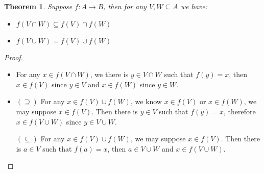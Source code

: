\documentclass[14pt]{extarticle}
\newtheorem{theorem}{Theorem}[section]
\newcommand{\1}{\{e\}}
\begin{document}
\begin{theorem}
  Suppose $f : A \rightarrow B$, then for any $V, W \subseteq A$
  we have:
  \begin{itemize}
    \item $f(V \cap W) \subseteq f(V) \cap f(W)$
    \item $f(V \cup W) = f(V) \cup f(W)$
  \end{itemize}
\end{theorem}
\begin{proof}
  ~
  \begin{itemize}
    \item For any $x \in f(V \cap W)$, we there is $y \in V \cap W$ such that $f(y) = x$,
          then $x \in f(V)$ since $y \in V$ and $x \in f(W)$ since $y \in W$.
    \item $(\supseteq)$ For any $x \in f(V) \cup f(W)$, we know $x \in f(V)$ or $x \in f(W)$,
          we may suppose $x \in f(V)$. Then there is $y \in V$ such that $f(y) = x$,
          therefore $x \in f(V \cup W)$ since $y \in V \cup W$.

          $(\subseteq)$ For any $x \in f(V) \cup f(W)$, we may suppose $x \in f(V)$.
          Then there is $a \in V$ such that $f(a) = x$, then $a \in V \cup W$ and
          $x \in f(V \cup W)$.
  \end{itemize}
\end{proof}
\end{document}
